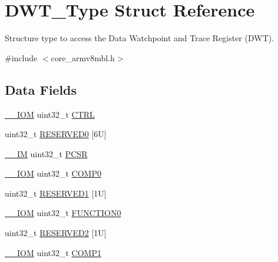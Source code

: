 \hypertarget{struct_d_w_t___type}{}\section{D\+W\+T\+\_\+\+Type Struct Reference}
\label{struct_d_w_t___type}


Structure type to access the Data Watchpoint and Trace Register (D\+WT).  




{\ttfamily \#include $<$core\+\_\+armv8mbl.\+h$>$}

\subsection*{Data Fields}
\begin{DoxyCompactItemize}
\item 
\mbox{\hyperlink{core__cm4_8h_ab6caba5853a60a17e8e04499b52bf691}{\+\_\+\+\_\+\+I\+OM}} uint32\+\_\+t \mbox{\hyperlink{struct_d_w_t___type_ac81efc171e9852a36caeb47122bfec5b}{C\+T\+RL}}
\item 
uint32\+\_\+t \mbox{\hyperlink{struct_d_w_t___type_a67a4fc1b84d0b73e6db59fadf990f3a4}{R\+E\+S\+E\+R\+V\+E\+D0}} \mbox{[}6\+U\mbox{]}
\item 
\mbox{\hyperlink{core__cm4_8h_a4cc1649793116d7c2d8afce7a4ffce43}{\+\_\+\+\_\+\+IM}} uint32\+\_\+t \mbox{\hyperlink{struct_d_w_t___type_a72e52fffe9ac6af0ee15877e2d5dac41}{P\+C\+SR}}
\item 
\mbox{\hyperlink{core__cm4_8h_ab6caba5853a60a17e8e04499b52bf691}{\+\_\+\+\_\+\+I\+OM}} uint32\+\_\+t \mbox{\hyperlink{struct_d_w_t___type_a5d0c69187f8abc99ecbde49431cf0050}{C\+O\+M\+P0}}
\item 
uint32\+\_\+t \mbox{\hyperlink{struct_d_w_t___type_aaa45b15c650670f4f84000a1f419ca00}{R\+E\+S\+E\+R\+V\+E\+D1}} \mbox{[}1\+U\mbox{]}
\item 
\mbox{\hyperlink{core__cm4_8h_ab6caba5853a60a17e8e04499b52bf691}{\+\_\+\+\_\+\+I\+OM}} uint32\+\_\+t \mbox{\hyperlink{struct_d_w_t___type_ad3c69d206a52a85165eb7bd8077b0608}{F\+U\+N\+C\+T\+I\+O\+N0}}
\item 
uint32\+\_\+t \mbox{\hyperlink{struct_d_w_t___type_a093dc351b7db0476c625f462acb9fd7f}{R\+E\+S\+E\+R\+V\+E\+D2}} \mbox{[}1\+U\mbox{]}
\item 
\mbox{\hyperlink{core__cm4_8h_ab6caba5853a60a17e8e04499b52bf691}{\+\_\+\+\_\+\+I\+OM}} uint32\+\_\+t \mbox{\hyperlink{struct_d_w_t___type_af9126caaf63b99d6df5d1e040c96e2ab}{C\+O\+M\+P1}}
\item 

\end{DoxyCompactItemize}
